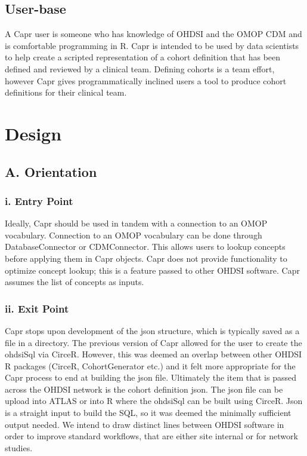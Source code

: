 \documentclass[
]{article}
\begin{document}
\subsection{User-base}\label{user-base}

A Capr user is someone who has knowledge of OHDSI and the OMOP CDM and
is comfortable programming in R. Capr is intended to be used by data
scientists to help create a scripted representation of a cohort
definition that has been defined and reviewed by a clinical team.
Defining cohorts is a team effort, however Capr gives programmatically
inclined users a tool to produce cohort definitions for their clinical
team.

\section{Design}\label{design}

\subsection{A. Orientation}\label{a.-orientation}

\subsubsection{i. Entry Point}\label{i.-entry-point}

Ideally, Capr should be used in tandem with a connection to an OMOP
vocabulary. Connection to an OMOP vocabulary can be done through
DatabaseConnector or CDMConnector. This allows users to lookup concepts
before applying them in Capr objects. Capr does not provide
functionality to optimize concept lookup; this is a feature passed to
other OHDSI software. Capr assumes the list of concepts as inputs.

\subsubsection{ii. Exit Point}\label{ii.-exit-point}

Capr stops upon development of the json structure, which is typically
saved as a file in a directory. The previous version of Capr allowed for
the user to create the ohdsiSql via CirceR. However, this was deemed an
overlap between other OHDSI R packages (CirceR, CohortGenerator etc.)
and it felt more appropriate for the Capr process to end at building the
json file. Ultimately the item that is passed across the OHDSI network
is the cohort definition json. The json file can be upload into ATLAS or
into R where the ohdsiSql can be built using CirceR. Json is a straight
input to build the SQL, so it was deemed the minimally sufficient output
needed. We intend to draw distinct lines between OHDSI software in order
to improve standard workflows, that are either site internal or for
network studies.
\end{document}
